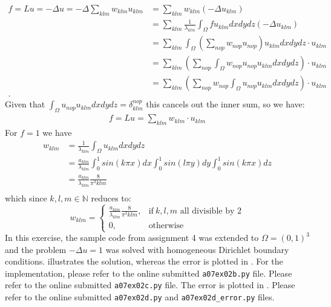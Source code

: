 \begin{align*}
    f=Lu =-\Delta u =-\Delta \sum_{klm} w_{klm} u_{klm} &= \sum_{klm} w_{klm} (-\Delta u_{klm})   \\
														&=\sum_{klm} \frac{1}{\lambda_{klm}} \int_\Omega f u_{klm} dxdydz (- \Delta u_{klm})\\
														&=\sum_{klm} \int_\Omega \left ( \sum_{nop}w_{nop}u_{nop}\right ) u_{klm} dxdydz \cdot u_{klm} \\
														&=\sum_{klm} \left ( \sum_{nop}   \int_\Omega  w_{nop}u_{nop} u_{klm} dxdydz \right ) \cdot u_{klm} \\
														&=\sum_{klm} \left ( \sum_{nop}   w_{nop} \int_\Omega  u_{nop} u_{klm} dxdydz \right ) \cdot u_{klm} \\
\text{.}
\end{align*}
%
Given that $ \int_\Omega  u_{nop} u_{klm} dxdydz =\delta_{klm}^{nop}$ this cancels out the inner sum, so we have:
%
\begin{align*}
    f=Lu =\sum_{klm} w_{klm} \cdot u_{klm}
\end{align*}
%
For $f=1$ we have 
%
\begin{align*}
    w_{klm}&=\frac{1}{\lambda_{klm}} \int_\Omega u_{klm} dxdydz\\
		   &=\frac{a_{klm}}{\lambda_{klm}}  \int_0^1 sin(k\pi x) dx \int_0^1 sin(l\pi y) dy \int_0^1 sin(k\pi x) dz\\
		   &=\frac{a_{klm}}{\lambda_{klm}}  \frac{8}{\pi^3klm}\\
\end{align*}
%
which since $k,l,m \in \mathbb{N}$ reduces to:
%
\begin{equation}
	w_{klm}=
	\begin{cases}
	\frac{a_{klm}}{\lambda_{klm}}  \frac{8}{\pi^3klm}, & \text{if}\ k,l,m \text{ all divisible by 2} \\
	0, & \text{otherwise}
	\end{cases}
\end{equation}
%
In this exercise, the sample code from assignment 4 was extended to $\Omega = (0,1)^3$ and the problem $-\Delta u = 1$ was solved with homogeneous Dirichlet boundary conditions.
 illustrates the solution, whereas the error is plotted in .
For the implementation, please refer to the online submitted \texttt{a07ex02b.py} file.
%
Please refer to the online submitted \texttt{a07ex02c.py} file.
%
The error is plotted in .
Please refer to the online submitted \texttt{a07ex02d.py} and \texttt{a07ex02d\_error.py} files.

